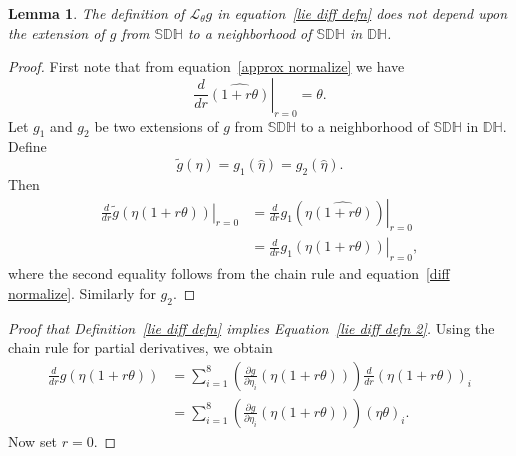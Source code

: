 \documentclass[reqno,12pt]{amsart}
\newcommand\setinvertibledualquat{\mathbb D\mathbb H}
\newcommand\setunitdualquat{\mathbb S\mathbb D\mathbb H}
\newcommand{\liederiv}{\mathcal L}
\newtheorem{lemma}{Lemma}
\begin{document}
\begin{lemma}
\label{not depend}
The definition of $\liederiv_\theta g$ in equation~\eqref{lie diff defn} does not depend upon the extension of $g$ from $\setunitdualquat$ to a neighborhood of $\setunitdualquat$ in $\setinvertibledualquat$.
\end{lemma}

\begin{proof}  First note that from equation~\eqref{approx normalize} we have
\begin{equation}
\label{diff normalize}
\left.\frac d{dr} \widehat{(1 + r \theta)} \right|_{r=0} = \theta.
\end{equation}
Let $g_1$ and $g_2$ be two extensions of $g$ from $\setunitdualquat$ to a neighborhood of $\setunitdualquat$ in $\setinvertibledualquat$.  Define
\begin{equation}
\tilde g(\eta) = g_1(\widehat\eta) = g_2(\widehat\eta).
\end{equation}
Then
\begin{equation}
\begin{aligned}
\left.\frac{d}{d r} \tilde g(\eta(1+r\theta)) \right |_{r = 0}
&=
\left.\frac{d}{d r} g_1(\eta\widehat{(1+r\theta)}) \right |_{r = 0} \\
&=\left.\frac{d}{d r} g_1(\eta(1+r\theta)) \right |_{r = 0},
\end{aligned}
\end{equation}
where the second equality follows from the chain rule and equation~\eqref{diff normalize}.  Similarly for $g_2$.
\end{proof}

\begin{proof}[Proof that Definition~\eqref{lie diff defn} implies Equation~\eqref{lie diff defn 2}]

Using the chain rule for partial derivatives, we obtain
\begin{equation}
\begin{aligned}
\frac{d}{d r} g(\eta(1+r\theta))
&= \sum_{i=1}^8 \left(\frac{\partial g}{\partial \eta_i}(\eta(1+r\theta))\right) \frac{d}{d r} (\eta(1+r\theta))_i 
\\
&= \sum_{i=1}^8 \left(\frac{\partial g}{\partial \eta_i}(\eta(1+r\theta))\right) (\eta\theta)_i .
\end{aligned}
\end{equation}
Now set $r = 0$.
\end{proof}
\end{document}

